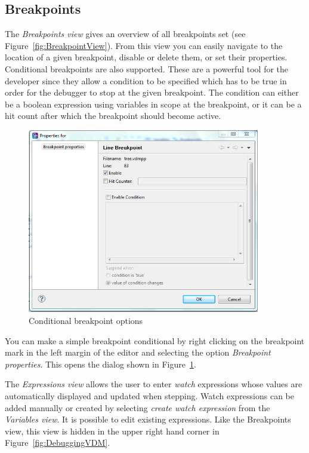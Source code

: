 \subsection{Breakpoints}
The \emph{Breakpoints view} gives an overview of all breakpoints set (see Figure~\ref{fig:BreakpointView}). From this view you can easily navigate to the location of a given breakpoint, disable or delete them, or set their properties.
Conditional breakpoints are also supported. These are a powerful tool for the developer since they allow a condition to be specified which has to be true in order for the debugger to stop at the given breakpoint. The condition can either be a boolean expression using variables in scope at the breakpoint, or it can be a hit count after which the breakpoint should become active.
%
\begin{figure}[htp]
\begin{center}
  \includegraphics[width=4in]{figures/Breakpointconditional}
  \caption{Conditional breakpoint options}
  \label{fig:BreakpointConditional}
\end{center}
\end{figure}
%
You can make a simple breakpoint conditional by right clicking on the breakpoint mark in the left margin of the editor and selecting the option \emph{Breakpoint properties}. This opens the dialog shown in Figure~\ref{fig:BreakpointConditional}.

The \emph{Expressions view} allows the user to enter \emph{watch} expressions whose values are automatically displayed and updated when stepping. Watch expressions can be added manually or created by selecting \emph{create watch expression} from the \emph{Variables view}. It is possible to edit existing expressions.  Like the Breakpoints view, this view is hidden in the upper right hand corner in Figure~\ref{fig:DebuggingVDM}.


